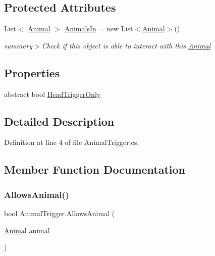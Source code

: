 \subsection*{Protected Attributes}
\begin{DoxyCompactItemize}
\item 
List$<$ \mbox{\hyperlink{class_animal}{Animal}} $>$ \mbox{\hyperlink{class_animal_trigger_acfc2fb2d9f72558027a49150e7e224ad}{Animals\+In}} = new List$<$\mbox{\hyperlink{class_animal}{Animal}}$>$()
\begin{DoxyCompactList}\small\item\em summary$>$Check if this object is able to interact with this \mbox{\hyperlink{class_animal}{Animal}}\end{DoxyCompactList}\end{DoxyCompactItemize}
\subsection*{Properties}
\begin{DoxyCompactItemize}
\item 
abstract bool \mbox{\hyperlink{class_animal_trigger_a7962bd6370a474f0d8cb69726ac783e5}{Head\+Trigger\+Only}}
\end{DoxyCompactItemize}


\subsection{Detailed Description}


Definition at line 4 of file Animal\+Trigger.\+cs.



\subsection{Member Function Documentation}
\mbox{\label{class_animal_trigger_ae8394dfcf5f91b8c413959a4d6baa3a9}} 
\subsubsection{\texorpdfstring{Allows\+Animal()}{AllowsAnimal()}}
{\footnotesize\ttfamily bool Animal\+Trigger.\+Allows\+Animal (\begin{DoxyParamCaption}\item[{\mbox{\hyperlink{class_animal}{Animal}}}]{animal }\end{DoxyParamCaption})}



